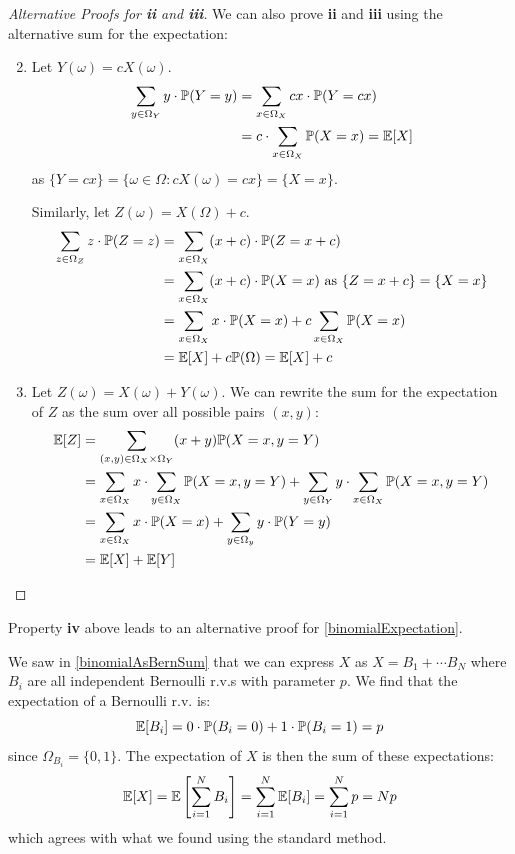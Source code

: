 \documentclass[../main.tex]{subfiles}
\begin{document}
\begin{proof}[Alternative Proofs for \textbf{ii} and \textbf{iii}]
  We can also prove \textbf{ii} and \textbf{iii} using the alternative sum for the expectation:
  \begin{enumerate}
    \setcounter{enumi}{1}
    \item Let $Y(\omega) = cX(\omega)$.
      \begin{align*}
        \sum_{y \in \Omega_Y} y \cdot \mathbb{P}(Y = y) &= \sum_{x \in \Omega_X} cx \cdot \mathbb{P}(Y = cx) \\
                                                &= c \cdot \sum_{x \in \Omega_X} \mathbb{P}(X = x) = \mathbb{E}[X]
      \end{align*}
      as $\{Y = cx\} = \{\omega \in \Omega: cX(\omega) = cx\} = \{X = x\}$.

      Similarly, let $Z(\omega) = X(\Omega) + c$.
      \begin{align*}
        \sum_{z \in \Omega_Z} z \cdot \mathbb{P}(Z = z) &= \sum_{x \in \Omega_X} (x + c) \cdot \mathbb{P}(Z = x + c) \\
                                                &= \sum_{x \in \Omega_X} (x + c) \cdot \mathbb{P}(X = x) \text{ as $\{Z = x + c\} = \{X = x\}$} \\
                                                &= \sum_{x \in \Omega_X} x \cdot \mathbb{P}(X = x) + c\sum_{x \in \Omega_X} \mathbb{P}(X = x) \\
                                                &= \mathbb{E}[X] + c \mathbb{P}(\Omega) = \mathbb{E}[X] + c
      \end{align*}
    \item Let $Z(\omega) = X(\omega) + Y(\omega)$.
      We can rewrite the sum for the expectation of $Z$ as the sum over all possible pairs $(x, y)$:
      \begin{align*}
        \mathbb{E}[Z] &= \sum_{(x, y) \in \Omega_X \times \Omega_Y} (x + y) \mathbb{P}(X = x, y = Y) \\
              &= \sum_{x \in \Omega_X} x \cdot \sum_{y \in \Omega_X} \mathbb{P}(X = x, y = Y) + \sum_{y \in \Omega_Y} y \cdot \sum_{x \in \Omega_X} \mathbb{P}(X = x, y = Y) \\
              &= \sum_{x \in \Omega_X} x \cdot \mathbb{P}(X = x) + \sum_{y \in \Omega_y} y \cdot \mathbb{P}(Y = y) \\
              &= \mathbb{E}[X] + \mathbb{E}[Y]
      \end{align*}
  \end{enumerate}
\end{proof}
\begin{remark}
  Property \textbf{iv} above leads to an alternative proof for \cref{binomialExpectation}.

  We saw in \cref{binomialAsBernSum} that we can express $X$ as $X = B_1 + \cdots B_N$ where $B_i$ are all independent Bernoulli r.v.s with parameter $p$.
  We find that the expectation of a Bernoulli r.v. is:
  \[
    \mathbb{E}[B_i] = 0 \cdot \mathbb{P}(B_i = 0) + 1 \cdot \mathbb{P}(B_i = 1) = p
  \]
  since $\Omega_{B_i} = \{0, 1\}$.
  The expectation of $X$ is then the sum of these expectations:
  \[
    \mathbb{E}[X] = \mathbb{E}\left[\sum_{i = 1}^{N} B_i\right] = \sum_{i = 1}^{N} \mathbb{E}[B_i] = \sum_{i = 1}^{N} p = Np
  \]
  which agrees with what we found using the standard method.
\end{remark}
\end{document}

